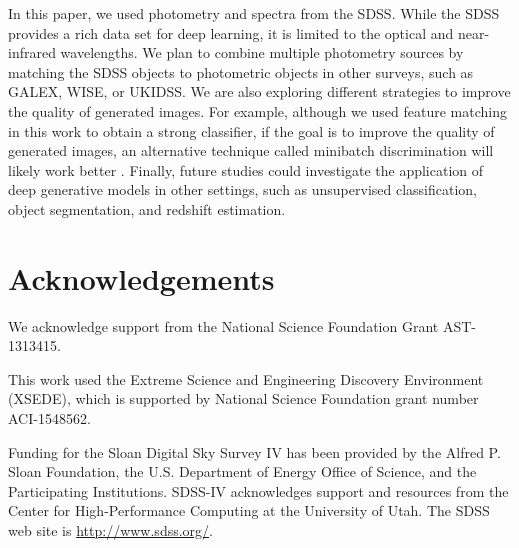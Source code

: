 \documentclass[fleqn,usenatbib]{mnras}
\begin{document}
In this paper, we used photometry and spectra from the SDSS.
While the SDSS provides a rich data set for deep learning,
it is limited to the optical and near-infrared wavelengths.
We plan to combine multiple photometry sources by matching the SDSS objects to
photometric objects in other surveys, such as GALEX, WISE, or UKIDSS.
We are also exploring different strategies to improve the quality of generated images.
For example, although we used feature matching in this work to obtain a strong classifier,
if the goal is to improve the quality of generated images, an alternative technique
called minibatch discrimination will likely work better \citep{salimans2016improved,dai2017good}.
Finally, future studies could investigate the application of deep generative models in other settings,
such as unsupervised classification, object segmentation, and redshift estimation.

\section*{Acknowledgements}

We acknowledge support from the National Science Foundation Grant AST-1313415.

This work used the Extreme Science and Engineering Discovery Environment (XSEDE), which is supported by National Science Foundation grant number ACI-1548562.

Funding for the Sloan Digital Sky Survey IV has been provided by
the Alfred P. Sloan Foundation, the U.S. Department of Energy Office of
Science, and the Participating Institutions. SDSS-IV acknowledges
support and resources from the Center for High-Performance Computing at
the University of Utah. The SDSS web site is \url{http://www.sdss.org/}.




\bsp	%
\label{lastpage}
\end{document}
